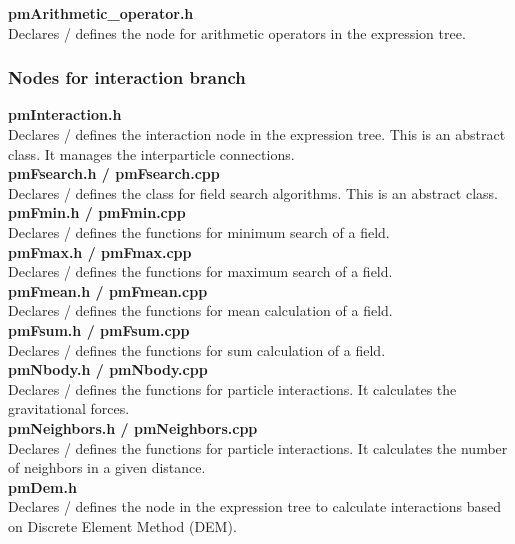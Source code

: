 \documentclass[a4paper,12pt,openany]{book}
\theoremstyle{break}
\begin{document}
\textbf{pmArithmetic\_operator.h} \\
Declares / defines the node for arithmetic operators in the expression tree. \\


\subsubsection{Nodes for interaction branch}
\textbf{pmInteraction.h} \\
Declares / defines the interaction node in the expression tree. This is an abstract class. It manages the interparticle connections. \\

\textbf{pmFsearch.h / pmFsearch.cpp} \\
Declares / defines the class for field search algorithms. This is an abstract class. \\

\textbf{pmFmin.h / pmFmin.cpp} \\
Declares / defines the functions for minimum search of a field.  \\

\textbf{pmFmax.h / pmFmax.cpp} \\
Declares / defines the functions for maximum search of a field. \\

\textbf{pmFmean.h / pmFmean.cpp} \\
Declares / defines the functions for mean calculation of a field. \\

\textbf{pmFsum.h / pmFsum.cpp} \\
Declares / defines the functions for sum calculation of a field. \\

\textbf{pmNbody.h / pmNbody.cpp} \\
Declares / defines the functions for particle interactions. It calculates the gravitational forces. \\

\textbf{pmNeighbors.h / pmNeighbors.cpp} \\
Declares / defines the functions for particle interactions. It calculates the number of neighbors in a given distance. \\

\textbf{pmDem.h} \\
Declares / defines the node in the expression tree to calculate interactions based on Discrete Element Method (DEM). \\
\end{document}
